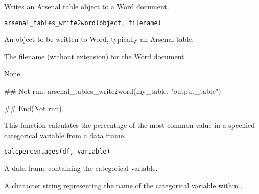 \documentclass[a4paper]{book}
\begin{document}
%
\begin{Description}
Writes an Arsenal table object to a Word document.
\end{Description}
%
\begin{Usage}
\begin{verbatim}
arsenal_tables_write2word(object, filename)
\end{verbatim}
\end{Usage}
%
\begin{Arguments}
\begin{ldescription}
\item[\code{object}] An object to be written to Word, typically an Arsenal table.

\item[\code{filename}] The filename (without extension) for the Word document.
\end{ldescription}
\end{Arguments}
%
\begin{Value}
None
\end{Value}
%
\begin{Examples}
\begin{ExampleCode}
## Not run: 
arsenal_tables_write2word(my_table, "output_table")

## End(Not run)
\end{ExampleCode}
\end{Examples}
%
\begin{Description}
This function calculates the percentage of the most common value in a specified categorical variable from a data frame.
\end{Description}
%
\begin{Usage}
\begin{verbatim}
calcpercentages(df, variable)
\end{verbatim}
\end{Usage}
%
\begin{Arguments}
\begin{ldescription}
\item[\code{df}] A data frame containing the categorical variable.

\item[\code{variable}] A character string representing the name of the categorical variable within .
\end{ldescription}
\end{Arguments}
\end{document}
